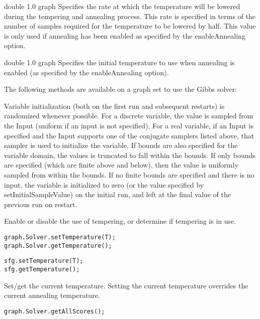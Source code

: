 
{double}
{1.0}
{graph}
{Specifies the rate at which the temperature will be lowered during the tempering and annealing process. This rate is specified in terms of the number of samples required for the temperature to be lowered by half. This value is only used if annealing has been enabled as specified by the enableAnnealing option.}


{double}
{1.0}
{graph}
{Specifies the initial temperature to use when annealing is enabled (as specified by the enableAnnealing option).}



The following methods are available on a graph set to use the Gibbs solver:

Variable initialization (both on the first run and subsequent restarts) is randomized whenever possible.  For a discrete variable, the value is sampled from the Input (uniform if an input is not specified).  For a real variable, if an Input is specified and the Input supports one of the conjugate samplers listed above, that sampler is used to initialize the variable.  If bounds are also specified for the variable domain, the values is truncated to fall within the bounds.  If only bounds are specified (which are finite above and below), then the value is uniformly sampled from within the bounds.  If no finite bounds are specified and there is no input, the variable is initialized to zero (or the value specified by setInitialSampleValue) on the initial run, and left at the final value of the previous run on restart.

Enable or disable the use of tempering, or determine if tempering is in use.

\ifmatlab
\begin{lstlisting}
graph.Solver.setTemperature(T);
graph.Solver.getTemperature();
\end{lstlisting}
\fi

\ifjava
\begin{lstlisting}
sfg.setTemperature(T);
sfg.getTemperature();
\end{lstlisting}
\fi

Set/get the current temperature. Setting the current temperature overrides the current annealing temperature.

\ifmatlab
\begin{lstlisting}
graph.Solver.getAllScores();
\end{lstlisting}
\fi

